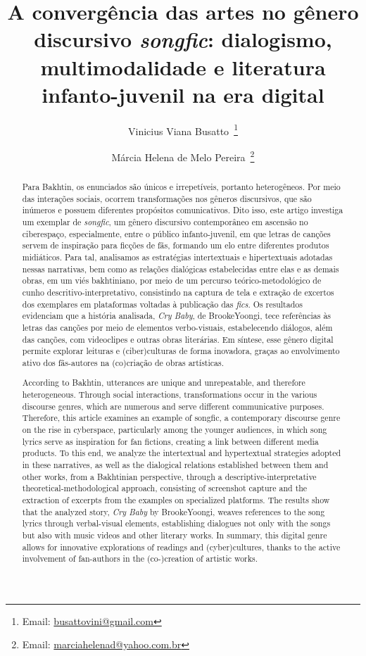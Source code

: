\documentclass[portuguese]{textolivre}
\title{A convergência das artes no gênero discursivo \emph{songfic}:
dialogismo, multimodalidade e literatura infanto-juvenil na era
digital}
\author[1]{Vinicius Viana Busatto~\orcid{0000-0001-6935-9108}\thanks{Email: \href{mailto:busattovini@gmail.com}{busattovini@gmail.com}}}
\author[1]{Márcia Helena de Melo Pereira~\orcid{0000-0002-3663-3462}\thanks{Email: \href{mailto:marciahelenad@yahoo.com.br}{marciahelenad@yahoo.com.br}}}
\affil[1]{Universidade Estadual do Sudoeste da Bahia, Programa de Pós-Graduação em Linguística, Departamento de Estudos Linguísticos e Literários, Vitória da Conquista, BA, Brasil}
\begin{document}
\maketitle
\begin{polyabstract}
\begin{abstract}
Para Bakhtin, os enunciados são únicos e irrepetíveis, portanto
heterogêneos. Por meio das interações sociais, ocorrem transformações
nos gêneros discursivos, que são inúmeros e possuem diferentes
propósitos comunicativos. Dito isso, este artigo investiga um exemplar
de \emph{songfic}, um gênero discursivo contemporâneo em ascensão no
ciberespaço, especialmente, entre o público infanto-juvenil, em que
letras de canções servem de inspiração para ficções de fãs, formando um
elo entre diferentes produtos midiáticos. Para tal, analisamos as
estratégias intertextuais e hipertextuais adotadas nessas narrativas,
bem como as relações dialógicas estabelecidas entre elas e as demais
obras, em um viés bakhtiniano, por meio de um percurso
teórico-metodológico de cunho descritivo-interpretativo, consistindo na
captura de tela e extração de excertos dos exemplares em plataformas
voltadas à publicação das \emph{fics}. Os resultados evidenciam que a
história analisada, \emph{Cry Baby}, de BrookeYoongi, tece referências
às letras das canções por meio de elementos verbo-visuais, estabelecendo
diálogos, além das canções, com videoclipes e outras obras literárias.
Em síntese, esse gênero digital permite explorar leituras e
(ciber)culturas de forma inovadora, graças ao envolvimento ativo dos
fãs-autores na (co)criação de obras artísticas.
  
\end{abstract}

\begin{english}
\begin{abstract}
According to Bakhtin, utterances are unique and unrepeatable,
and therefore heterogeneous. Through social interactions,
transformations occur in the various discourse genres, which are
numerous and serve different communicative purposes. Therefore, this
article examines an example of songfic, a contemporary discourse genre
on the rise in cyberspace, particularly among the younger audiences, in
which song lyrics serve as inspiration for fan fictions, creating a link
between different media products. To this end, we analyze the
intertextual and hypertextual strategies adopted in these narratives, as
well as the dialogical relations established between them and other
works, from a Bakhtinian perspective, through a
descriptive-interpretative theoretical-methodological approach,
consisting of screenshot capture and the extraction of excerpts from the
examples on specialized platforms. The results show that the analyzed
story, \emph{Cry Baby} by BrookeYoongi, weaves references to the song
lyrics through verbal-visual elements, establishing dialogues not only
with the songs but also with music videos and other literary works. In
summary, this digital genre allows for innovative explorations of
readings and (cyber)cultures, thanks to the active involvement of
fan-authors in the (co-)creation of artistic works.


\end{abstract}
\end{english}
\end{polyabstract}
\end{document}
